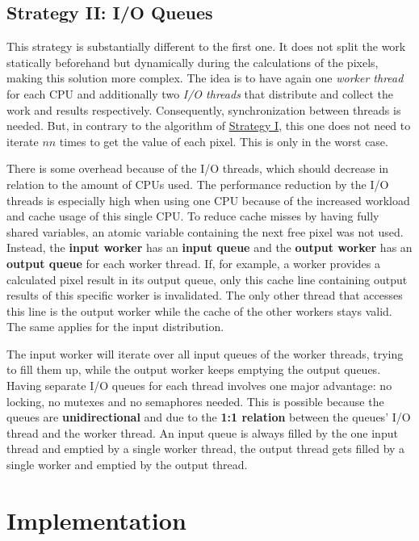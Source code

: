 \subsection{Strategy II: I/O Queues}
\label{ssec:strategy-ii}

This strategy is substantially different to the first one. It does not split the work statically beforehand but dynamically during the calculations of the pixels, making this solution more complex. The idea is to have again one \textit{worker thread} for each CPU and additionally two \textit{I/O threads} that distribute and collect the work and results respectively. Consequently, synchronization between threads is needed. But, in contrary to the algorithm of \hyperref[ssec:strategy-i]{Strategy I}, this one does not need to iterate $nn$ times to get the value of each pixel. This is only in the worst case.

There is some overhead because of the I/O threads, which should decrease in relation to the amount of CPUs used. The performance reduction by the I/O threads is especially high when using one CPU because of the increased workload and cache usage of this single CPU. To reduce cache misses by having fully shared variables, an atomic variable containing the next free pixel was not used. Instead, the \textbf{input worker} has an \textbf{input queue} and the \textbf{output worker} has an \textbf{output queue} for each worker thread. If, for example, a worker provides a calculated pixel result in its output queue, only this cache line containing output results of this specific worker is invalidated. The only other thread that accesses this line is the output worker while the cache of the other workers stays valid. The same applies for the input distribution.

The input worker will iterate over all input queues of the worker threads, trying to fill them up, while the output worker keeps emptying the output queues. Having separate I/O queues for each thread involves one major advantage: no locking, no mutexes and no semaphores needed. This is possible because the queues are \textbf{unidirectional} and due to the \textbf{1:1 relation} between the queues' I/O thread and the worker thread. An input queue is always filled by the one input thread and emptied by a single worker thread, the output thread gets filled by a single worker and emptied by the output thread.


\clearpage
\section{Implementation}
\label{ssec:Details}


